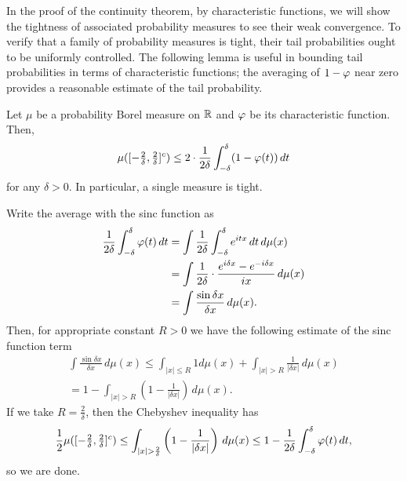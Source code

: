 \documentclass{../../small}
\begin{document}
In the proof of the continuity theorem, by characteristic functions, we will show the tightness of associated probability measures to see their weak convergence.
To verify that a family of probability measures is tight, their tail probabilities ought to be uniformly controlled.
The following lemma is useful in bounding tail probabilities in terms of characteristic functions; the averaging of $1-\varphi$ near zero provides a reasonable estimate of the tail probability.

\begin{lem}
Let $\mu$ be a probability Borel measure on $\mathbb{R}$ and $\varphi$ be its characteristic function.
Then,
\[\mu([-\tfrac2\delta,\tfrac2\delta]^c)\le2\cdot\frac1{2\delta}\int_{-\delta}^\delta(1-\varphi(t))\,dt\]
for any $\delta>0$.
In particular, a single measure is tight.
\end{lem}
\begin{pf}
Write the average with the sinc function as
\begin{align*}
\frac1{2\delta}\int_{-\delta}^\delta\varphi(t)\,dt
&=\int\frac1{2\delta}\int_{-\delta}^\delta e^{itx}\,dt\,d\mu(x)\\
&=\int\frac1{2\delta}\cdot\frac{e^{i\delta x}-e^{-i\delta x}}{ix}\,d\mu(x)\\
&=\int\frac{\sin\delta x}{\delta x}\,d\mu(x).
\end{align*}
Then, for appropriate constant $R>0$ we have the following estimate of the sinc function term
\begin{align*}
\int\frac{\sin\delta x}{\delta x}\,d\mu(x)
\le\int_{|x|\le R}1d\mu(x)+\int_{|x|>R}\frac1{|\delta x|}\,d\mu(x)\\
=1-\int_{|x|>R}\left(1-\frac1{|\delta x|}\right)\,d\mu(x).
\end{align*}
If we take $R=\frac2\delta$, then the Chebyshev inequality has
\[\frac12\mu([-\tfrac2\delta,\tfrac2\delta]^c)\le\int_{|x|>\frac2\delta}\left(1-\frac1{|\delta x|}\right)\,d\mu(x)\le1-\frac1{2\delta}\int_{-\delta}^\delta\f(t)\,dt,\]
so we are done.
\end{pf}
\end{document}
